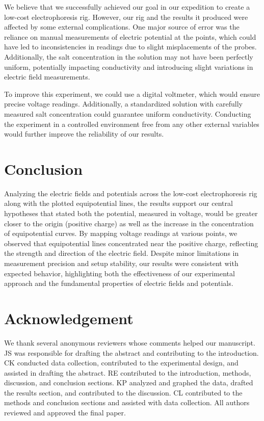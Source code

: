 \documentclass[10pt,journal,twoside]{IEEEtran}
\begin{document}
We believe that we successfully achieved our goal in our expedition to create a low-cost electrophoresis rig. However, our rig and the results it produced were affected by some external complications. One major source of error was the reliance on manual measurements of electric potential at the points, which could have led to inconsistencies in readings due to slight misplacements of the probes. Additionally, the salt concentration in the solution may not have been perfectly uniform, potentially impacting conductivity and introducing slight variations in electric field measurements. 

To improve this experiment, we could use a digital voltmeter, which would ensure precise voltage readings. Additionally, a standardized solution with carefully measured salt concentration could guarantee uniform conductivity. Conducting the experiment in a controlled environment free from any other external variables would further improve the reliability of our results.





\section{Conclusion}
Analyzing the electric fields and potentials across the low-cost electrophoresis rig along with the plotted equipotential lines, the results support our central hypotheses that stated both the potential, measured in voltage, would be greater closer to the origin (positive charge) as well as the increase in the concentration of equipotential curves. By mapping voltage readings at various points, we observed that equipotential lines concentrated near the positive charge, reflecting the strength and direction of the electric field. Despite minor limitations in measurement precision and setup stability, our results were consistent with expected behavior, highlighting both the effectiveness of our experimental approach and the fundamental properties of electric fields and potentials.






\section{Acknowledgement}
We thank several anonymous reviewers whose comments helped our manuscript. JS was responsible for drafting the abstract and contributing to the introduction. CK conducted data collection, contributed to the experimental design, and assisted in drafting the abstract. RE contributed to the introduction, methods, discussion, and conclusion sections. KP analyzed and graphed the data, drafted the results section, and contributed to the discussion. CL contributed to the methods and conclusion sections and assisted with data collection. All authors reviewed and approved the final paper.
\end{document}

